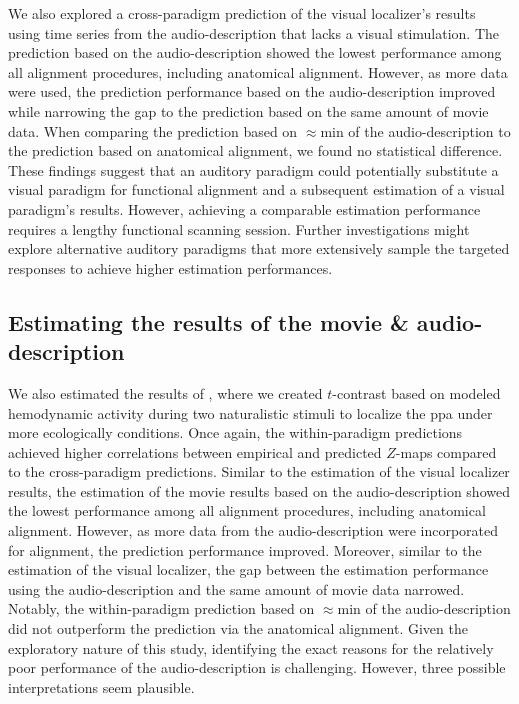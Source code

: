 %
We also explored a cross-paradigm prediction of the visual localizer's results
using time series from the audio-description that lacks a visual stimulation.
%
The prediction based on the audio-description showed the lowest performance
among all alignment procedures, including anatomical alignment.
%
However, as more data were used, the prediction performance based on the
audio-description improved while narrowing the gap to the prediction based on
the same amount of movie data.
%
When comparing the prediction based on $\approx$\unit[120]{min} of the
audio-description to the prediction based on anatomical alignment, we found no
statistical difference.
%
These findings suggest that an auditory paradigm could potentially substitute a
visual paradigm for functional alignment and a subsequent estimation of a visual
paradigm's results.
%
However, achieving a comparable estimation performance requires a lengthy
functional scanning session.
%
Further investigations might explore alternative auditory paradigms that more
extensively sample the targeted responses to achieve higher estimation
performances.


\subsection{Estimating the results of the movie \& audio-description}
%
We also estimated the results of \citet{haeusler2022processing}, where we
created $t$-contrast based on modeled hemodynamic activity during two
naturalistic stimuli to localize the \ac{ppa} under more ecologically
conditions.
%
Once again, the within-paradigm predictions achieved higher correlations between
empirical and predicted $Z$-maps compared to the cross-paradigm predictions.
%
Similar to the estimation of the visual localizer results, the estimation of the
movie results based on the audio-description showed the lowest performance among
all alignment procedures, including anatomical alignment.
%
However, as more data from the audio-description were incorporated for
alignment, the prediction performance improved.
%
Moreover, similar to the estimation of the visual localizer, the gap between the
estimation performance using the audio-description and the same amount of movie
data narrowed.
%
Notably, the within-paradigm prediction based on $\approx$\unit[15]{min} of the
audio-description did not outperform the prediction via the anatomical
alignment.
%
Given the exploratory nature of this study, identifying the exact reasons for
the relatively poor performance of the audio-description is challenging.
%
However, three possible interpretations seem plausible.
%

